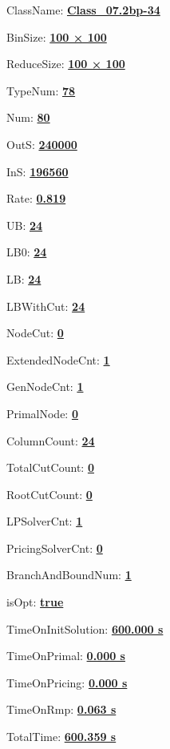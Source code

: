 \documentclass[11pt]{article}
\begin{document}
\pagestyle{empty}


ClassName: \underline{\textbf{Class_07.2bp-34}}
\par
BinSize: \underline{\textbf{100 × 100}}
\par
ReduceSize: \underline{\textbf{100 × 100}}
\par
TypeNum: \underline{\textbf{78}}
\par
Num: \underline{\textbf{80}}
\par
OutS: \underline{\textbf{240000}}
\par
InS: \underline{\textbf{196560}}
\par
Rate: \underline{\textbf{0.819}}
\par
UB: \underline{\textbf{24}}
\par
LB0: \underline{\textbf{24}}
\par
LB: \underline{\textbf{24}}
\par
LBWithCut: \underline{\textbf{24}}
\par
NodeCut: \underline{\textbf{0}}
\par
ExtendedNodeCnt: \underline{\textbf{1}}
\par
GenNodeCnt: \underline{\textbf{1}}
\par
PrimalNode: \underline{\textbf{0}}
\par
ColumnCount: \underline{\textbf{24}}
\par
TotalCutCount: \underline{\textbf{0}}
\par
RootCutCount: \underline{\textbf{0}}
\par
LPSolverCnt: \underline{\textbf{1}}
\par
PricingSolverCnt: \underline{\textbf{0}}
\par
BranchAndBoundNum: \underline{\textbf{1}}
\par
isOpt: \underline{\textbf{true}}
\par
TimeOnInitSolution: \underline{\textbf{600.000 s}}
\par
TimeOnPrimal: \underline{\textbf{0.000 s}}
\par
TimeOnPricing: \underline{\textbf{0.000 s}}
\par
TimeOnRmp: \underline{\textbf{0.063 s}}
\par
TotalTime: \underline{\textbf{600.359 s}}
\par
\newpage


\end{document}
